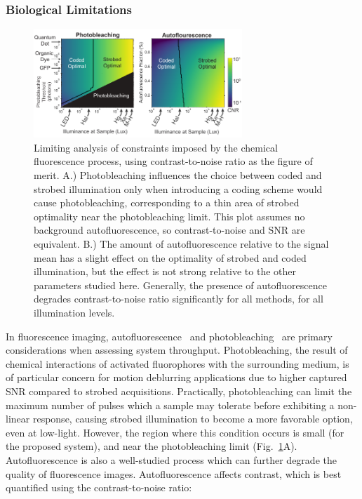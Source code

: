 \subsubsection{Biological Limitations}

\begin{figure}
  \centering
    \includegraphics[width=0.7\textwidth]{figures/fig_highthroughput_fluorescence_analysis.pdf}
      \caption{\label{fig:fluorescence_analysis} Limiting analysis of constraints imposed by the chemical fluorescence process, using contrast-to-noise ratio as the figure of merit. A.) Photobleaching influences the choice between coded and strobed illumination only when introducing a coding scheme would cause photobleaching, corresponding to a thin area of strobed optimality near the photobleaching limit. This plot assumes no background autofluorescence, so contrast-to-noise and SNR are equivalent. B.) The amount of autofluorescence relative to the signal mean has a slight effect on the optimality of strobed and coded illumination, but the effect is not strong relative to the other parameters studied here. Generally, the presence of autofluorescence degrades contrast-to-noise ratio significantly for all methods, for all illumination levels.}
\end{figure}

In fluorescence imaging, autofluorescence~\cite{autofluor} and photobleaching~\cite{lippincott2003photobleaching} are primary considerations when assessing system throughput. Photobleaching, the result of chemical interactions of activated fluorophores with the surrounding medium, is of particular concern for motion deblurring applications due to higher captured SNR compared to strobed acquisitions. Practically, photobleaching can limit the maximum number of pulses which a sample may tolerate before exhibiting a non-linear response, causing strobed illumination to become a more favorable option, even at low-light. However, the region where this condition occurs is small (for the proposed system), and near the photobleaching limit (Fig.~\ref{fig:fluorescence_analysis}A). Autofluorescence is also a well-studied process which can further degrade the quality of fluorescence images. Autofluorescence affects contrast, which is best quantified using the contrast-to-noise ratio:

